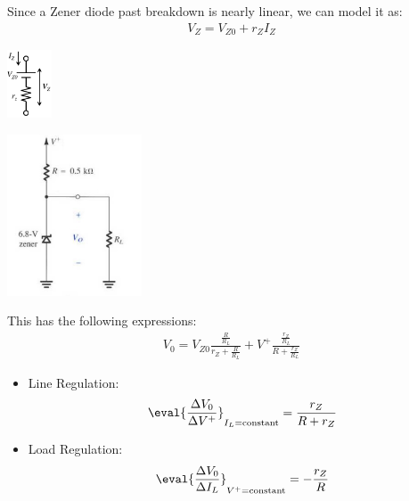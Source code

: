 \documentclass{article}
\begin{document}
 Since a Zener diode past breakdown is nearly linear,
we can model it as:
\begin{align*}
  V_Z = V_{Z0} + r_Z I_Z
\end{align*}
\begin{center}
  \includegraphics[width=0.1\textwidth]{images/zener_model.jpg}
\end{center}


\begin{center}
  \includegraphics[width=0.3\textwidth]{images/zener_regulator.jpg}
\end{center}
This has the following expressions:
\begin{align*}
  V_0 = V_{Z0} \frac{\frac{R}{R_L}}{r_Z + \frac{R}{R_L}} + V^+ \frac{\frac{r_Z}{R_L}}{R + \frac{r_Z}{R_L}}
\end{align*}

\begin{itemize}
\item Line Regulation:
  \begin{align*}
    \eval{\frac{\Delta V_0}{\Delta V^+}}_{I_L=\text{constant}} = \frac{r_Z}{R + r_Z}
  \end{align*}
\item Load Regulation:
  \begin{align*}
    \eval{\frac{\Delta V_0}{\Delta I_L}}_{V^+ = \text{constant}} = - \frac{r_Z}{R}
  \end{align*}
\end{itemize}

\clearpage
\end{document}
